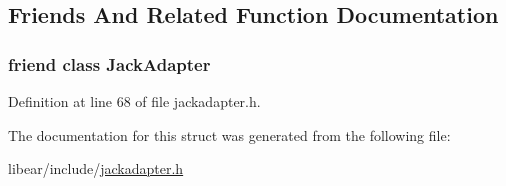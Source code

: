 \subsection{\-Friends \-And \-Related \-Function \-Documentation}
\hypertarget{structStereoPort_ad8cc007d4c961816b3ea53a853b8ca16}{
\subsubsection[{\-Jack\-Adapter}]{\setlength{\rightskip}{0pt plus 5cm}friend class {\bf \-Jack\-Adapter}}}\label{d9/d6d/structStereoPort_ad8cc007d4c961816b3ea53a853b8ca16}


\-Definition at line 68 of file jackadapter.\-h.



\-The documentation for this struct was generated from the following file\-:\begin{DoxyCompactItemize}
\item 
libear/include/\hyperlink{jackadapter_8h}{jackadapter.\-h}\end{DoxyCompactItemize}
